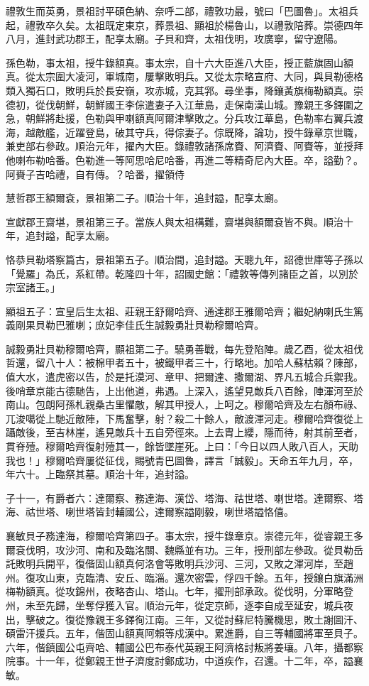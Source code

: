 \begin{pinyinscope}
禮敦生而英勇，景祖討平碩色納、奈呼二部，禮敦功最，號曰「巴圖魯」。太祖兵起，禮敦卒久矣。太祖既定東京，葬景祖、顯祖於楊魯山，以禮敦陪葬。崇德四年八月，進封武功郡王，配享太廟。子貝和齊，太祖伐明，攻廣寧，留守遼陽。

孫色勒，事太祖，授牛錄額真。事太宗，自十六大臣進八大臣，授正藍旗固山額真。從太宗圍大凌河，軍城南，屢擊敗明兵。又從太宗略宣府、大同，與貝勒德格類入獨石口，敗明兵於長安嶺，攻赤城，克其郛。尋坐事，降鑲黃旗梅勒額真。崇德初，從伐朝鮮，朝鮮國王李倧遣妻子入江華島，走保南漢山城。豫親王多鐸圍之急，朝鮮將赴援，色勒與甲喇額真阿爾津擊敗之。分兵攻江華島，色勒率右翼兵渡海，越敵艦，近躍登島，破其守兵，得倧妻子。倧既降，論功，授牛錄章京世職，兼吏部右參政。順治元年，擢內大臣。錄禮敦諸孫席賚、阿濟賚、阿賚等，並授拜他喇布勒哈番。色勒進一等阿思哈尼哈番，再進二等精奇尼內大臣。卒，謚勤？。阿賚子吉哈禮，自有傳。？哈番，擢領侍

慧哲郡王額爾袞，景祖第二子。順治十年，追封謚，配享太廟。

宣獻郡王齋堪，景祖第三子。當族人與太祖構難，齋堪與額爾袞皆不與。順治十年，追封謚，配享太廟。

恪恭貝勒塔察篇古，景祖第五子。順治間，追封謚。天聰九年，詔德世庫等子孫以「覺羅」為氏，系紅帶。乾隆四十年，詔國史館：「禮敦等傳列諸臣之首，以別於宗室諸王。」

顯祖五子：宣皇后生太祖、莊親王舒爾哈齊、通達郡王雅爾哈齊；繼妃納喇氏生篤義剛果貝勒巴雅喇；庶妃李佳氏生誠毅勇壯貝勒穆爾哈齊。

誠毅勇壯貝勒穆爾哈齊，顯祖第二子。驍勇善戰，每先登陷陣。歲乙酉，從太祖伐哲還，留八十人：被棉甲者五十，被鐵甲者三十，行略地。加哈人蘇枯賴？陳部，值大水，遣虎密以告，於是托漠河、章甲、把爾達、撒爾湖、界凡五城合兵禦我。後哨章京能古德馳告，上出他道，弗遇。上深入，遙望見敵兵八百餘，陣渾河至於南山。包朗阿孫札親桑古里懼敵，解其甲授人，上呵之。穆爾哈齊及左右顏布祿、兀浚噶從上馳近敵陣，下馬奮擊，射？殺二十餘人，敵渡渾河走。穆爾哈齊復從上躡敵後，至吉林崖，遙見敵兵十五自旁徑來。上去胄上纓，隱而待，射其前至者，貫脊殪。穆爾哈齊復射殪其一，餘皆墜崖死。上曰：「今日以四人敗八百人，天助我也！」穆爾哈齊屢從征伐，賜號青巴圖魯，譯言「誠毅」。天命五年九月，卒，年六十。上臨祭其墓。順治十年，追封謚。

子十一，有爵者六：達爾察、務達海、漢岱、塔海、祜世塔、喇世塔。達爾察、塔海、祜世塔、喇世塔皆封輔國公，達爾察謚剛毅，喇世塔謚恪僖。

襄敏貝子務達海，穆爾哈齊第四子。事太宗，授牛錄章京。崇德元年，從睿親王多爾袞伐明，攻沙河、南和及臨洺關、魏縣並有功。三年，授刑部左參政。從貝勒岳託敗明兵開平，復偕固山額真何洛會等敗明兵沙河、三河，又敗之渾河岸，至趙州。復攻山東，克臨清、安丘、臨淄。還次密雲，俘四千餘。五年，授鑲白旗滿洲梅勒額真。從攻錦州，夜略杏山、塔山。七年，擢刑部承政。從伐明，分軍略登州，未至先歸，坐奪俘獲入官。順治元年，從定京師，逐李自成至延安，城兵夜出，擊破之。復從豫親王多鐸徇江南。三年，又從討蘇尼特騰機思，敗土謝圖汗、碩雷汗援兵。五年，偕固山額真阿賴等戍漢中。累進爵，自三等輔國將軍至貝子。六年，偕鎮國公屯齊哈、輔國公巴布泰代英親王阿濟格討叛將姜瓖。八年，攝都察院事。十一年，從鄭親王世子濟度討鄭成功，中道疾作，召還。十二年，卒，謚襄敏。


\end{pinyinscope}
